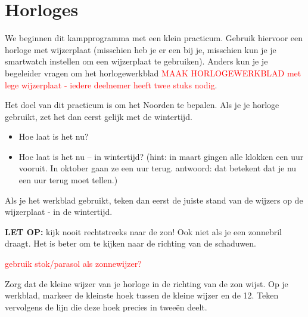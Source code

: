 \chapter{Horloges}

We beginnen dit kampprogramma met een klein practicum. Gebruik hiervoor een horloge met wijzerplaat (misschien heb je er een bij je, misschien kun je je smartwatch instellen om een wijzerplaat te gebruiken). Anders kun je je begeleider vragen om het horlogewerkblad \textcolor{red}{MAAK HORLOGEWERKBLAD met lege wijzerplaat - iedere deelnemer heeft twee stuks nodig}.

Het doel van dit practicum is om het Noorden te bepalen. Als je je horloge gebruikt, zet het dan eerst gelijk met de wintertijd.

\begin{itemize}
\item Hoe laat is het nu?
\item Hoe laat is het nu -- in wintertijd? (hint: in maart gingen alle klokken een uur vooruit. In oktober gaan ze een uur terug. antwoord: dat betekent dat je nu een uur terug moet tellen.)
\end{itemize}

Als je het werkblad gebruikt, teken dan eerst de juiste stand van de wijzers op de wijzerplaat - in de wintertijd.

\textbf{LET OP:} kijk nooit rechtstreeks naar de zon! Ook niet als je een zonnebril draagt. Het is beter om te kijken naar de richting van de schaduwen.

\textcolor{red}{gebruik stok/parasol als zonnewijzer?}

Zorg dat de kleine wijzer van je horloge in de richting van de zon wijst. Op je werkblad, markeer de kleinste hoek tussen de kleine wijzer en de 12. Teken vervolgens de lijn die deze hoek precies in twee\"{e}n deelt.

